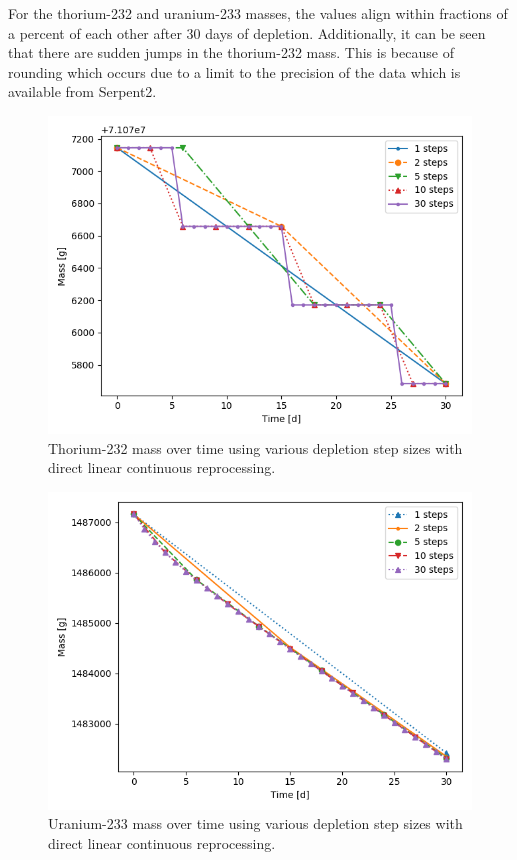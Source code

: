 For the thorium-232 and uranium-233 masses, the values align within fractions of a percent of each other after 30 days of depletion. Additionally, it can be seen that there are sudden jumps in the thorium-232 mass. This is because of rounding which occurs due to a limit to the precision of the data which is available from Serpent2.

\begin{figure}[H]
  \centering
  \includegraphics[scale=0.5]{images/DL_NSTEP_Th-232_mass.png}
  \caption{Thorium-232 mass over time using various depletion step sizes with direct linear continuous reprocessing.}
   \label{fig:DL-cont-th}
\end{figure}

\begin{figure}[H]
  \centering
  \includegraphics[scale=0.5]{images/DL_NSTEP_U-233_mass.png}
  \caption{Uranium-233 mass over time using various depletion step sizes with direct linear continuous reprocessing.}
   \label{fig:DL-cont-u}
\end{figure}

